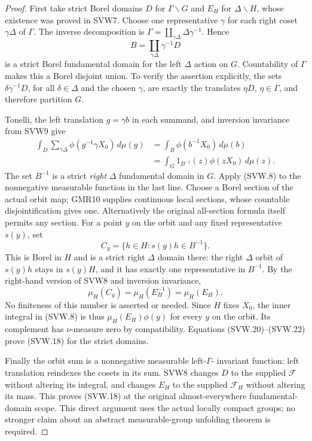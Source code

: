 \documentclass[11pt,a4paper]{article}
\numberwithin{equation}{section}
\theoremstyle{remark}\newtheorem{remark}[theorem]{Remark}
\begin{document}
\begin{proof}
First take strict Borel domains $D$ for $\Gamma\backslash G$ and
$E_H$ for $\Delta\backslash H$, whose existence was proved in
SVW7.  Choose one representative $\gamma$ for each right coset
$\gamma\Delta$ of $\Gamma$.  The inverse decomposition is
$\Gamma=\coprod_{\gamma\Delta}\Delta\gamma^{-1}$.  Hence
\[
          B=\coprod_{\gamma\Delta}\gamma^{-1}D
 \tag{SVW.19}
\]
is a strict Borel fundamental domain for the left $\Delta$ action
on $G$.  Countability of $\Gamma$ makes this a Borel disjoint union.
To verify the assertion explicitly, the sets
$\delta\gamma^{-1}D$, for all $\delta\in\Delta$ and the chosen
$\gamma$, are exactly the translates $\eta D$, $\eta\in\Gamma$,
and therefore partition $G$.

Tonelli, the left translation $g=\gamma b$ in each summand, and
inversion invariance from SVW9 give
\[
 \begin{split}
 \int_D\sum_{\gamma\Delta}\phi(g^{-1}\gamma X_0)\,d\mu(g)
     &=\int_B\phi(b^{-1}X_0)\,d\mu(b)\\
     &=\int_G1_{B^{-1}}(z)\phi(zX_0)\,d\mu(z).
 \end{split}
 \tag{SVW.20}
\]
The set $B^{-1}$ is a strict \emph{right} $\Delta$ fundamental
domain in $G$.  Apply (SVW.8) to the nonnegative measurable function
in the last line.  Choose a Borel section of the actual orbit map;
GMR10 supplies continuous local sections, whose countable
disjointification gives one.  Alternatively the original
all-section formula itself permits any section.  For a point $y$
on the orbit and any fixed representative $s(y)$, set
\[
            C_y=\{h\in H:s(y)h\in B^{-1}\}.
 \tag{SVW.21}
\]
This is Borel in $H$ and is a strict right $\Delta$ domain there:
the right $\Delta$ orbit of $s(y)h$ stays in $s(y)H$, and it has
exactly one representative in $B^{-1}$.  By the right-hand version
of SVW8 and inversion invariance,
\[
             \mu_H(C_y)=\mu_H(E_H^{-1})=\mu_H(E_H).
 \tag{SVW.22}
\]
No finiteness of this number is asserted or needed.  Since $H$
fixes $X_0$, the inner integral in (SVW.8) is thus
$\mu_H(E_H)\phi(y)$ for every $y$ on the orbit.  Its complement
has $\nu$-measure zero by compatibility.  Equations
(SVW.20)--(SVW.22) prove (SVW.18) for the strict domains.

Finally the orbit sum is a nonnegative measurable left-$\Gamma$-
invariant function: left translation reindexes the cosets in its
sum.  SVW8 changes $D$ to the supplied $\mathcal F$ without altering
its integral, and changes $E_H$ to the supplied $\mathcal F_H$
without altering its mass.  This proves (SVW.18) at the original
almost-everywhere fundamental-domain scope.  This direct argument
uses the actual locally compact groups; no stronger claim about
an abstract measurable-group unfolding theorem is required.
\end{proof}
\end{document}
